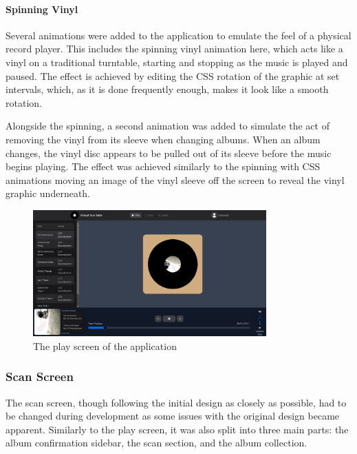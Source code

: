 \paragraph{Spinning Vinyl}
Several animations were added to the application to emulate the feel of a physical record player. This includes the spinning vinyl animation here, which acts like a vinyl on a traditional turntable, starting and stopping as the music is played and paused. The effect is achieved by editing the CSS rotation of the graphic at set intervals, which, as it is done frequently enough, makes it look like a smooth rotation.

Alongside the spinning, a second animation was added to simulate the act of removing the vinyl from its sleeve when changing albums. When an album changes, the vinyl disc appears to be pulled out of its sleeve before the music begins playing. The effect was achieved similarly to the spinning with CSS animations moving an image of the vinyl sleeve off the screen to reveal the vinyl graphic underneath.

\begin{figure} [H]
    \centering
    \includegraphics[width=0.8\textwidth]{figures/play_screen.png}
    \caption{The play screen of the application}
    \label{fig:play_screen}
\end{figure}

\subsubsection{Scan Screen}
The scan screen, though following the initial design as closely as possible, had to be changed during development as some issues with the original design became apparent. Similarly to the play screen, it was also split into three main parts: the album confirmation sidebar, the scan section, and the album collection.

